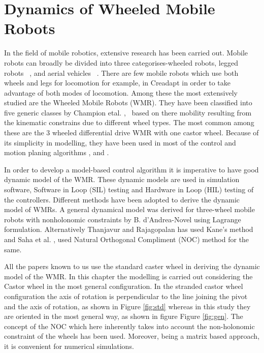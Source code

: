 \chapter{Dynamics of Wheeled Mobile Robots }
\label{c4_SenCal}
In the field of mobile robotics, extensive research has been carried out. 
Mobile robots can broadly be divided into three categorises-wheeled robots, legged robots ~\cite{machado2006overview}, and aerial vehicles ~\cite{valavanis2014handbook}. 
There are few mobile robots which use both wheels and legs for locomotion for example, in Creadapt  \cite{mouret2015evolutionary} in order to take advantage of both modes of locomotion. 
Among these the most extensively studied are the  Wheeled Mobile Robots (WMR). 
They have been classified into five generic classes by Champion etal. \cite{campion1996structural},~\cite{campion2008wheeled}  based on there mobility resulting from the kinematic constrains due to  different wheel types.
 The most common among these are the  3 wheeled differential drive WMR with one castor wheel.
  Because of its simplicity in modelling, they have been used in most of the  control and motion planing algorithms  \cite{desantis1995modeling}, \cite{koh1999smooth} and \cite{d1995control}. 

In order to develop a model-based control algorithm it is imperative to have good dynamic model of the WMR.
 These dynamic models are used in  simulation software,  Software in Loop (SIL) testing and Hardware in Loop (HIL) testing  of the controllers.
 Different methods have  been adopted to derive the dynamic model of WMRs.
  A general dynamical model was derived for three-wheel mobile robots with nonholonomic constraints  by B. d'Andrea-Novel \cite{d1991modelling} using  Lagrange formulation.
    Alternatively Thanjavur and Rajagopalan \cite{thanjavur1997ease} has used Kane's method  and  Saha et al. \cite{saha1991dynamics},\cite{saha1989kinematics} used Natural Orthogonal Compliment (NOC) method for the same.  
 
All the papers known to us use the standard caster wheel in deriving the dynamic model of the WMR. In this chapter the modelling is carried out considering the Castor wheel in the most general configuration.
 In the stranded castor wheel configuration the axis of rotation is perpendicular to the line joining the pivot and the axis of rotation, as shown in Figure \ref{fig:std} whereas in this study they are oriented in  the most general way, as shown in figure Figure \ref{fig:gen}. 
 The concept of the NOC which here inherently takes into account the non-holonomic constraint of the wheels has been used.
  Moreover, being a matrix based approach, it is convenient for numerical simulations. 
